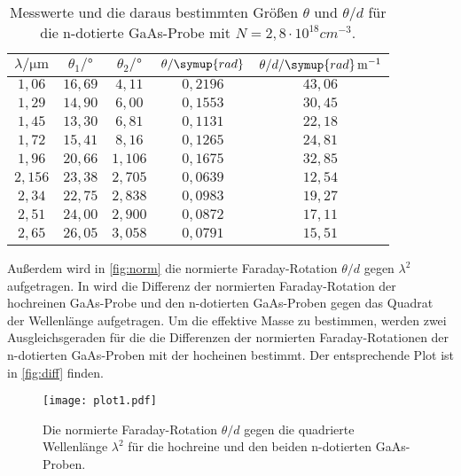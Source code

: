 \begin{table}[hbt!]
  \centering
  \caption{Messwerte und die daraus bestimmten Größen $\theta$ und $\theta/d$ für die n-dotierte GaAs-Probe
  mit $N=2,8 \cdot 10^{18} \si{cm}^{-3}$.}
  \label{tab:m3}
  \begin{tabular}{c c c c c}
    \toprule
    $\lambda/\si{\micro\meter}$ & $\theta_{1}/\si{\degree}$ & $\theta_{2}/\si{\degree}$ & $\theta/\symup{rad}$ & $\theta/d/\symup{rad}\, \si{m}^{-1}$\\
    \midrule
    $1,06 $ & $16,69$ & $4,11$  & $0,2196$ & $43,06$ \\
    $1,29 $ & $14,90$ & $6,00$  & $0,1553$ & $30,45$ \\
    $1,45 $ & $13,30$ & $6,81$  & $0,1131$ & $22,18$ \\
    $1,72 $ & $15,41$ & $8,16$  & $0,1265$ & $24,81$ \\
    $1,96 $ & $20,66$ & $1,106$ & $0,1675$ & $32,85$ \\
    $2,156$ & $23,38$ & $2,705$ & $0,0639$ & $12,54$ \\
    $2,34 $ & $22,75$ & $2,838$ & $0,0983$ & $19,27$ \\
    $2,51 $ & $24,00$ & $2,900$ & $0,0872$ & $17,11$ \\
    $2,65 $ & $26,05$ & $3,058$ & $0,0791$ & $15,51$ \\
    \bottomrule
  \end{tabular}
\end{table}
Außerdem wird in \autoref{fig:norm} die normierte Faraday-Rotation $\theta/d$ gegen $\lambda^2$ aufgetragen.
In wird die Differenz der normierten Faraday-Rotation der hochreinen GaAs-Probe und den n-dotierten GaAs-Proben
gegen das Quadrat der Wellenlänge aufgetragen. Um die effektive Masse zu bestimmen, werden zwei Ausgleichsgeraden
für die die Differenzen der normierten Faraday-Rotationen der n-dotierten GaAs-Proben mit der hocheinen bestimmt.
Der entsprechende Plot ist in \autoref{fig:diff} finden.
\begin{figure}[hbt!]
  \label{fig:norm}
  \texttt{[image: plot1.pdf]}
  \caption{Die normierte Faraday-Rotation $\theta/d$ gegen die quadrierte Wellenlänge $\lambda^2$ für die
  hochreine und den beiden n-dotierten GaAs-Proben.}
\end{figure}

